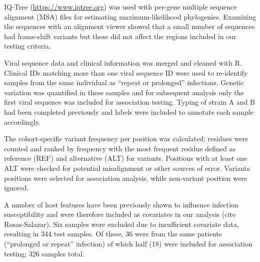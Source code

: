 \documentclass{article} %
\begin{document}
IQ-Tree 
(\url{https://www.iqtree.org})
\cite{nguyen2015iq}
was used with per-gene multiple sequence alignment (MSA) files for estimating maximum-likelihood phylogenies.
Examining the sequences with an alignment viewer showed that a small number of sequences had frame-shift variants but these did not affect the regions included in our testing criteria.

Viral sequence data and clinical information was merged and cleaned with R.
Clinical IDs matching more than one viral sequence ID were used to re-identify samples from the same individual as ``repeat or prolonged'' infections. 
Genetic variation was quantified in these samples and for subsequent analysis only the first viral sequence was included for association testing. 
Typing of strain A and B had been completed previously and labels were included to annotate each sample accordingly.

The cohort-specific variant frequency per position was calculated;
residues were counted and ranked by frequency
with the most frequent residue defined as reference (REF) and alternative (ALT) for variants.
Positions with at least one ALT were checked for potential misalignment or other sources of error. 
Variants positions were selected for association analysis, while non-variant position were ignored.

A number of host features have been previously shown to influence infection susceptibility and were therefore included as covariates in our analysis (cite Rosas-Salazar).
Six samples were excluded due to insufficient covariate data, resulting in 344 test samples. 
Of these, 36 were from the same patients (``prolonged or repeat'' infection) of which half (18) were included for association testing; 326 samples total.
\end{document}
